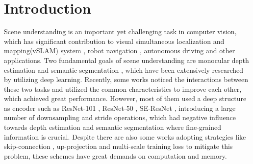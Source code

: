 \documentclass[sn-mathphys]{sn-jnl}
\theoremstyle{thmstyleone}\newtheorem{theorem}{Theorem}\newtheorem{proposition}[theorem]{Proposition}
\theoremstyle{thmstyletwo}\newtheorem{example}{Example}\newtheorem{remark}{Remark}
\theoremstyle{thmstylethree}\newtheorem{definition}{Definition}\usepackage[numbers,sort&compress]{natbib}
\begin{document}





\maketitle

\section{Introduction}\label{sec1}

Scene understanding is an important yet challenging task in computer vision, which has significant contribution to visual simultaneous localization and mapping(vSLAM) system \cite{Kang_2010}, robot navigation \cite{Husbands_2021}, autonomous driving \cite{Lee_2020} and other applications. Two fundamental goals of scene understanding are monocular depth estimation \cite{eigen2014depth,Xu_2018,Liu_2015,Cao_2018} and semantic segmentation \cite{Wang_2018, Lan_2021,Long_2015,Lin_2016}, which have been extensively researched by utilizing deep learning. Recently, some works \cite{Xu_2018,guizilini2020semantically,Zhang_2019} noticed the interactions between these two tasks and utilized the common characteristics to improve each other, which achieved great performance. However, most of them used a deep structure as encoder such as ResNet-101 \cite{guizilini2020semantically}, ResNet-50 \cite{Zhang_2018}, SE-ResNet \cite{choi2020safenet}, introducing a large number of downsampling and stride operations, which had negative influence \cite{Fu_2018} towards depth estimation and semantic segmentation where fine-grained information is crucial. Despite there are also some works adopting strategies like skip-connection \cite{choi2020safenet}, up-projection \cite{Zhang_2019} and multi-scale training loss \cite{Zhang_2018} to mitigate this problem, these schemes have great demands on computation and memory.
\end{document}

